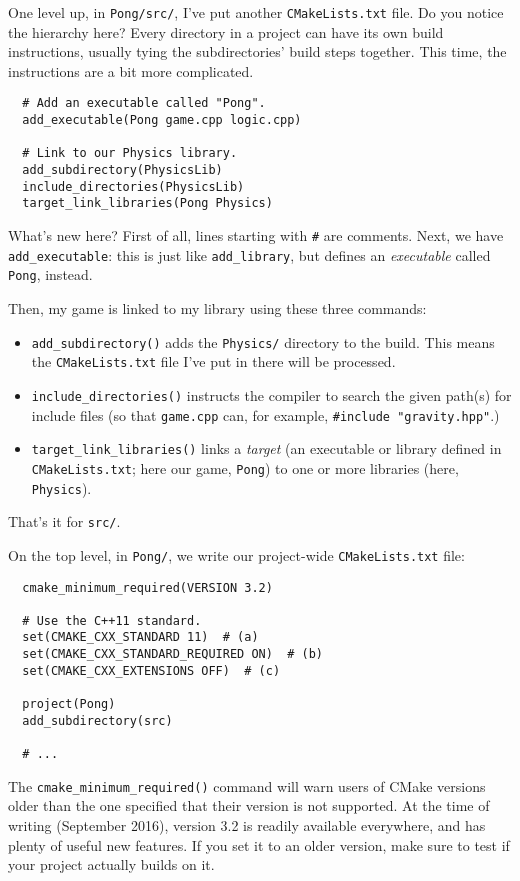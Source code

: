 \documentclass[12pt,a4paper]{article}
\newcommand{\cod}[1]{{\color{red!60!black}\texttt{#1}}}
\begin{document}
  One level up, in \cod{Pong/src/}, I've put another \cod{CMakeLists.txt} 
  file. Do you 
  notice the hierarchy here? Every directory in a project can have its own 
  build instructions, usually tying the subdirectories' build steps together.
  This time, the instructions are a bit more complicated.
  \begin{lstlisting}
  # Add an executable called "Pong".
  add_executable(Pong game.cpp logic.cpp)
  
  # Link to our Physics library.
  add_subdirectory(PhysicsLib)
  include_directories(PhysicsLib)
  target_link_libraries(Pong Physics)
  \end{lstlisting}
  What's new here? First of all, lines starting with \cod{\#} are comments. 
  Next, we have \cod{add\_executable}: this is just like 
  \cod{add\_library}, but defines an \textit{executable} called 
  \cod{Pong}, instead.
  
  Then, my game is linked to my library using these three commands:
  \begin{itemize}
    \item  \cod{add\_subdirectory()} adds the 
    \cod{Physics/} directory to the build. This means the 
    \cod{CMakeLists.txt} file I've put in there will be processed.
    \item  \cod{include\_directories()} instructs the compiler to 
    search the given path(s) for include files (so that \cod{game.cpp} can, 
    for example, \cod{\#include "gravity.hpp"}.)
    \item \cod{target\_link\_libraries()} links a \textit{target} (an 
    executable or 
    library defined in \cod{CMakeLists.txt}; here our game, 
    \cod{Pong}) to one or more libraries (here, \cod{Physics}).
  \end{itemize}
  That's it for \cod{src/}. \pagebreak
  
  On the top level, in \cod{Pong/}, we write our project-wide 
  \cod{CMakeLists.txt} file:
  
  \begin{lstlisting}
  cmake_minimum_required(VERSION 3.2)
  
  # Use the C++11 standard.
  set(CMAKE_CXX_STANDARD 11)  # (a)
  set(CMAKE_CXX_STANDARD_REQUIRED ON)  # (b)
  set(CMAKE_CXX_EXTENSIONS OFF)  # (c)
  
  project(Pong)
  add_subdirectory(src)
  
  # ...
  \end{lstlisting}
  
  The \cod{cmake\_minimum\_required()} command will warn users of CMake 
  versions older than the one specified that their version is not 
  supported. At the time of writing (September 2016), version 3.2 is readily 
  available everywhere, and has plenty of useful new features. If you set it to
  an older version, make sure to test if your project actually builds on it.
  
\end{document}
